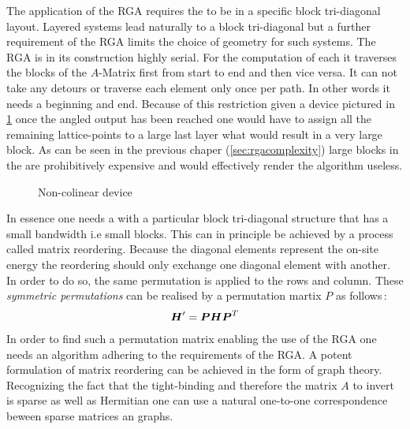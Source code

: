 The application of the RGA requires the \hamil{} to be in a specific block tri-diagonal layout. Layered systems lead naturally to a block tri-diagonal \hamil{} but a further requirement of the RGA limits the choice of geometry for such systems. The RGA is in its construction highly serial. For the computation of each \gfnc{} it traverses the blocks of the $A$-Matrix first from start to end and then vice versa. It can not take any detours or traverse each element only once per path. In other words it needs a beginning and end. Because of this restriction given a device pictured in \ref{fig:noncolinear} once the angled output has been reached one would have to assign all the remaining lattice-points to a large last layer what would result in a very large block. As can be seen in the previous chaper (\ref{sec:rgacomplexity}) large blocks in the \hamil{} are prohibitively expensive and would effectively render the algorithm useless.
\begin{figure}[!ht]
\caption{Non-colinear device}
\label{fig:noncolinear}
\end{figure}
In essence one needs a \hamil{} with a particular block tri-diagonal structure that has a small bandwidth  i.e small blocks. This can in principle be achieved by a process called matrix reordering. Because the diagonal elements represent the on-site energy the reordering should only exchange one diagonal element with another. In order to do so, the same permutation is applied to the rows and column. These \emph{symmetric permutations} can be realised by a permutation martix $P$ as follows\,\cite{saad2003iterative}:
\begin{align}
\boldsymbol{H}' = \boldsymbol{P} \boldsymbol{H} \boldsymbol{P}^{T}
\label{eqn:permutation}
\end{align}
In order to find such a permutation matrix enabling the use of the RGA one needs an algorithm adhering to the requirements of the RGA.
A potent formulation of matrix reordering can be achieved in the form of graph theory. Recognizing the fact that the tight-binding \hamil{} and therefore the matrix $A$ to invert is sparse as well as Hermitian one can use a natural one-to-one correspondence beween sparse matrices an graphs.
